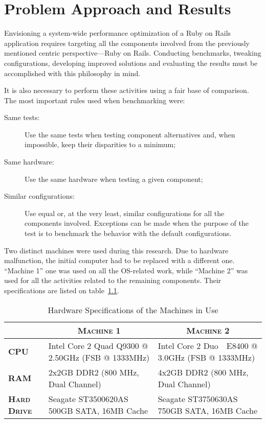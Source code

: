 \chapter{Problem Approach and Results} %
\label{cha:problem_approach_and_results}

Envisioning a system-wide performance optimization of a Ruby on Rails application requires targeting all the components involved from the previously mentioned centric perspective---Ruby on Rails. Conducting benchmarks, tweaking configurations, developing improved solutions and evaluating the results must be accomplished with this philosophy in mind. 

It is also necessary to perform these activities using a fair base of comparison. The most important rules used when benchmarking were:
\begin{description}
  \item[Same tests:] Use the same tests when testing component alternatives and, when impossible, keep their disparities to a minimum;
  \item[Same hardware:] Use the same hardware when testing a given component;
  \item[Similar configurations:] Use equal or, at the very least, similar configurations for all the components involved. Exceptions can be made when the purpose of the test is to benchmark the behavior with the default configurations.
\end{description}

Two distinct machines were used during this research. Due to hardware malfunction, the initial computer had to be replaced with a different one. ``Machine 1'' one was used on all the OS-related work, while ``Machine 2'' was used for all the activities related to the remaining components. Their specifications are listed on table~\ref{tab:machines_hardware_specification}.
\begin{table}[ht]
  \centering
  \caption{Hardware Specifications of the Machines in Use}
  \label{tab:machines_hardware_specification}
  
  \begin{tabular}{p{}|p{}|p{}}
    & \multicolumn{1}{c|}{\textbf{\textsc{Machine 1}}} & \multicolumn{1}{c}{\textbf{\textsc{Machine 2}}} \\ \hline

    \textbf{\textsc{CPU}} & Intel Core 2 Quad Q9300 @ 2.50GHz (FSB @ 1333MHz) & Intel Core 2 Duo ~\,E8400 @ 3.0GHz (FSB @ 1333MHz) \\ \hline
    \textbf{\textsc{RAM}} & 2x2GB DDR2 (800 MHz, Dual Channel) & 4x2GB DDR2 (800 MHz, Dual Channel) \\ \hline
    \textbf{\textsc{Hard Drive}} & Seagate ST3500620AS 500GB SATA, 16MB Cache & Seagate ST3750630AS 750GB SATA, 16MB Cache \\
  
  \end{tabular}
\end{table}

